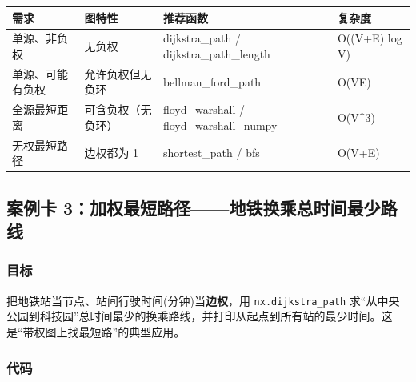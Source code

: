 {\def\LTcaptype{none} %
\begin{longtable}[]{@{}
  >{\raggedright\arraybackslash}p{}
  >{\raggedright\arraybackslash}p{}
  >{\raggedright\arraybackslash}p{}
  >{\raggedright\arraybackslash}p{}@{}}
\toprule\noalign{}
\begin{minipage}[b]{\linewidth}\raggedright
需求
\end{minipage} & \begin{minipage}[b]{\linewidth}\raggedright
图特性
\end{minipage} & \begin{minipage}[b]{\linewidth}\raggedright
推荐函数
\end{minipage} & \begin{minipage}[b]{\linewidth}\raggedright
复杂度
\end{minipage} \\
\midrule\noalign{}
\endhead
\bottomrule\noalign{}
\endlastfoot
单源、非负权 & 无负权 & dijkstra\_path / dijkstra\_path\_length &
O((V+E) log V) \\
单源、可能有负权 & 允许负权但无负环 & bellman\_ford\_path & O(VE) \\
全源最短距离 & 可含负权（无负环） & floyd\_warshall /
floyd\_warshall\_numpy & O(V\^{}3) \\
无权最短路径 & 边权都为 1 & shortest\_path / bfs & O(V+E) \\
\end{longtable}
}

\subsection{案例卡
3：加权最短路径------地铁换乘总时间最少路线}\label{ux6848ux4f8bux5361-3ux52a0ux6743ux6700ux77edux8defux5f84ux5730ux94c1ux6362ux4e58ux603bux65f6ux95f4ux6700ux5c11ux8defux7ebf}

\subsubsection{目标}\label{ux76eeux6807-26}

把地铁站当节点、站间行驶时间(分钟)当\textbf{边权}，用
\texttt{nx.dijkstra\_path}
求``从中央公园到科技园''总时间最少的换乘路线，并打印从起点到所有站的最少时间。这是``带权图上找最短路''的典型应用。

\subsubsection{代码}\label{ux4ee3ux7801-27}

